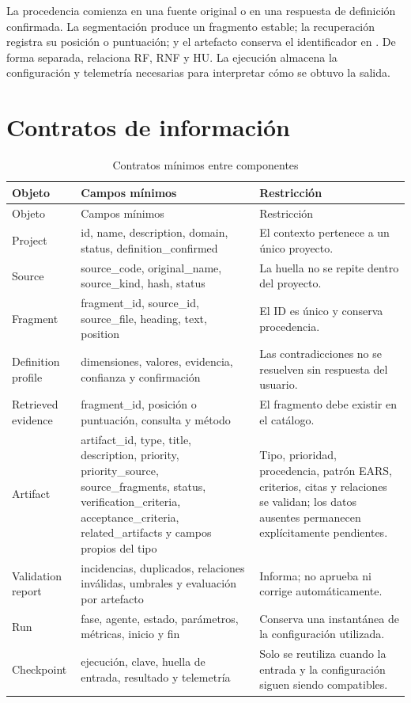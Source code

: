 La procedencia comienza en una fuente original o en una respuesta de definición confirmada. La segmentación produce un fragmento estable; la recuperación registra su posición o puntuación; y el artefacto conserva el identificador en . De forma separada,  relaciona RF, RNF y HU. La ejecución almacena la configuración y telemetría necesarias para interpretar cómo se obtuvo la salida.

\section{Contratos de información}

\begin{longtable}{p{3.1cm}p{5.5cm}p{5.8cm}}
  \caption{Contratos mínimos entre componentes}
  \label{tab:contratos-arquitectura}\\
  \toprule
  Objeto & Campos mínimos & Restricción \\
  \midrule
  \endfirsthead
  \toprule
  Objeto & Campos mínimos & Restricción \\
  \midrule
  \endhead
  Project & id, name, description, domain, status, definition\_confirmed & El contexto pertenece a un único proyecto. \\
  Source & source\_code, original\_name, source\_kind, hash, status & La huella no se repite dentro del proyecto. \\
  Fragment & fragment\_id, source\_id, source\_file, heading, text, position & El ID es único y conserva procedencia. \\
  Definition profile & dimensiones, valores, evidencia, confianza y confirmación & Las contradicciones no se resuelven sin respuesta del usuario. \\
  Retrieved evidence & fragment\_id, posición o puntuación, consulta y método & El fragmento debe existir en el catálogo. \\
  Artifact & artifact\_id, type, title, description, priority, priority\_source, source\_fragments, status, verification\_criteria, acceptance\_criteria, related\_artifacts y campos propios del tipo & Tipo, prioridad, procedencia, patrón EARS, criterios, citas y relaciones se validan; los datos ausentes permanecen explícitamente pendientes. \\
  Validation report & incidencias, duplicados, relaciones inválidas, umbrales y evaluación por artefacto & Informa; no aprueba ni corrige automáticamente. \\
  Run & fase, agente, estado, parámetros, métricas, inicio y fin & Conserva una instantánea de la configuración utilizada. \\
  Checkpoint & ejecución, clave, huella de entrada, resultado y telemetría & Solo se reutiliza cuando la entrada y la configuración siguen siendo compatibles. \\
  \bottomrule
\end{longtable}

